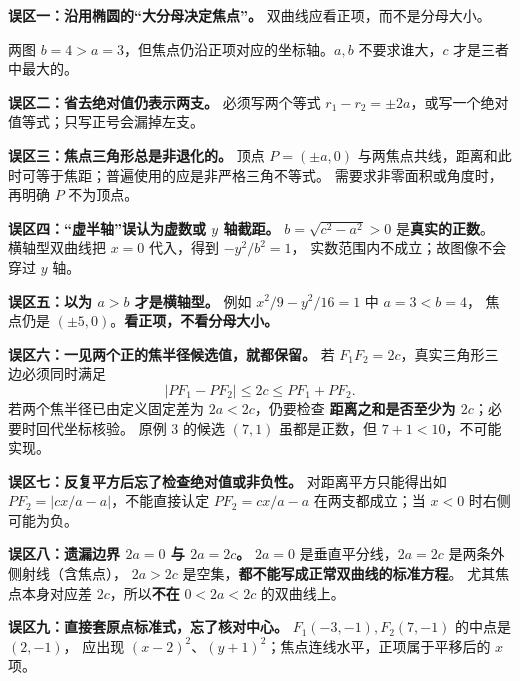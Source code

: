\begin{trapbox}
\textbf{误区一：沿用椭圆的“大分母决定焦点”。} 双曲线应看正项，而不是分母大小。

两图 $b=4>a=3$，但焦点仍沿正项对应的坐标轴。$a,b$ 不要求谁大，$c$ 才是三者中最大的。

\textbf{误区二：省去绝对值仍表示两支。}
必须写两个等式 $r_1-r_2=\pm2a$，或写一个绝对值等式；只写正号会漏掉左支。

\textbf{误区三：焦点三角形总是非退化的。}
顶点 $P=(\pm a,0)$ 与两焦点共线，距离和此时可等于焦距；普遍使用的应是非严格三角不等式。
需要求非零面积或角度时，再明确 $P$ 不为顶点。
\end{trapbox}
\clearpage

\begin{trapbox}
\textbf{误区四：“虚半轴”误认为虚数或 $y$ 轴截距。}
$b=\sqrt{c^2-a^2}>0$ 是\textbf{真实的正数}。
横轴型双曲线把 $x=0$ 代入，得到 $-y^2/b^2=1$，
实数范围内不成立；故图像不会穿过 $y$ 轴。

\textbf{误区五：以为 $a>b$ 才是横轴型。}
例如 $x^2/9-y^2/16=1$ 中 $a=3<b=4$，
焦点仍是 $(\pm5,0)$。\textbf{看正项，不看分母大小。}

\textbf{误区六：一见两个正的焦半径候选值，就都保留。}
若 $F_1F_2=2c$，真实三角形三边必须同时满足
\[
|PF_1-PF_2|\le 2c\le PF_1+PF_2.
\]
若两个焦半径已由定义固定差为 $2a<2c$，仍要检查
\textbf{距离之和是否至少为 $2c$}；必要时回代坐标核验。
原例 3 的候选 $(7,1)$ 虽都是正数，但 $7+1<10$，不可能实现。

\textbf{误区七：反复平方后忘了检查绝对值或非负性。}
对距离平方只能得出如
$PF_2=\left|cx/a-a\right|$，不能直接认定 $PF_2=cx/a-a$
在两支都成立；当 $x<0$ 时右侧可能为负。

\textbf{误区八：遗漏边界 $2a=0$ 与 $2a=2c$。}
$2a=0$ 是垂直平分线，$2a=2c$ 是两条外侧射线（含焦点），
$2a>2c$ 是空集，\textbf{都不能写成正常双曲线的标准方程}。
尤其焦点本身对应差 $2c$，所以\textbf{不在} $0<2a<2c$ 的双曲线上。

\textbf{误区九：直接套原点标准式，忘了核对中心。}
$F_1(-3,-1),F_2(7,-1)$ 的中点是 $(2,-1)$，
应出现 $(x-2)^2$、$(y+1)^2$；焦点连线水平，正项属于平移后的 $x$ 项。
\end{trapbox}
\clearpage
